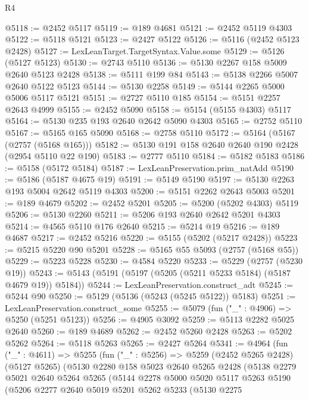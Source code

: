 \begin{lexlean}{R4}
\begin{coremodule}
@5118 := @2452 @5117
@5119 := @189 @4681
@5121 := @2452 @5119 @4303
@5122 := @5118 @5121
@5123 := @2427 @5122
@5126 := @5116 (@2452 @5123 @2428)
@5127 := LexLeanTarget.TargetSyntax.Value.some
@5129 := @5126 (@5127 @5123)
@5130 := @2743 @5110
@5136 := @5130 @2267 @158 @5009 @2640 @5123 @2428
@5138 := @5111 @199 @84
@5143 := @5138 @2266 @5007 @2640 @5122 @5123
@5144 := @5130 @2258
@5149 := @5144 @2265 @5000 @5006 @5117 @5121
@5151 := @2727 @5110 @185
@5154 := @5151 @2257 @2643 @4999
@5155 := @2452 @5090
@5158 := @5154 (@5155 @4303) @5117
@5164 := @5130 @235 @193 @2640 @2642 @5090 @4303
@5165 := @2752 @5110
@5167 := @5165 @165 @5090
@5168 := @2758 @5110
@5172 := @5164 (@5167 (@2757 (@5168 @165)))
@5182 := @5130 @191 @158 @2640 @2640 @190 @2428 (@2954 @5110 @22 @190)
@5183 := @2777 @5110
@5184 := @5182 @5183
@5186 := @5158 (@5172 @5184)
@5187 := LexLeanPreservation.prim_natAdd
@5190 := @5186 (@5187 @4675 @19)
@5191 := @5149 @5190
@5197 := @5130 @2263 @193 @5004 @2642 @5119 @4303
@5200 := @5151 @2262 @2643 @5003
@5201 := @189 @4679
@5202 := @2452 @5201
@5205 := @5200 (@5202 @4303) @5119
@5206 := @5130 @2260
@5211 := @5206 @193 @2640 @2642 @5201 @4303
@5214 := @4565 @5110 @176 @2640
@5215 := @5214 @19
@5216 := @189 @4687
@5217 := @2452 @5216
@5220 := @5155 (@5202 (@5217 @2428))
@5223 := @5215 @5220 @90 @5201
@5228 := @5165 @55 @5093 (@2757 (@5168 @55))
@5229 := @5223 @5228
@5230 := @4584 @5220
@5233 := @5229 (@2757 (@5230 @19))
@5243 := @5143 (@5191 (@5197 (@5205 (@5211 @5233 @5184) (@5187 @4679 @19)) @5184))
@5244 := LexLeanPreservation.construct_adt
@5245 := @5244 @90
@5250 := @5129 (@5136 (@5243 (@5245 @5122)) @5183)
@5251 := LexLeanPreservation.construct_some
@5255 := @5079 (fun ("_" : @4906) => @5250 (@5251 @5123))
@5256 := @4905 @3092
@5259 := @5113 @2282 @5025 @2640
@5260 := @189 @4689
@5262 := @2452 @5260 @2428
@5263 := @5202 @5262
@5264 := @5118 @5263
@5265 := @2427 @5264
@5341 := @4964
    (fun ("_" : @4611) =>
    @5255
      (fun ("_" : @5256) =>
      @5259
        (@2452 @5265 @2428)
        (@5127 @5265)
        (@5130
          @2280
          @158
          @5023
          @2640
          @5265
          @2428
          (@5138
            @2279
            @5021
            @2640
            @5264
            @5265
            (@5144
              @2278
              @5000
              @5020
              @5117
              @5263
              @5190
              (@5206
                @2277
                @2640
                @5019
                @5201
                @5262
                @5233
                (@5130
                  @2275

\end{coremodule}
\end{lexlean}

